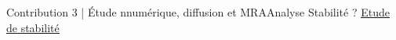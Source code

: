 \begin{frame}{Contribution 3 | Étude nnumérique, diffusion et MRA}{Analyse Stabilité ?}
    \centering \Large
    \href{https://github.com/Ocelot-Pale/etude_MR_RK2}{\color{Primary} \underline{Etude de stabilité}}\color{black}
\end{frame}